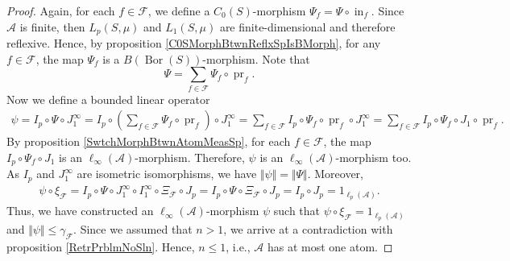 \documentclass[12pt]{article}
\begin{document}
\begin{proof}
    Again, for each $f\in\mathcal{F}$, we define 
    a $C_0(S)$-morphism $\Psi_f=\Psi\circ \operatorname{in}_f$. 
    Since $\mathcal{A}$ is finite, then $L_p(S,\mu)$ and $L_1(S,\mu)$ are
    finite-dimensional and therefore reflexive. Hence, by 
    proposition \ref{C0SMorphBtwnReflxSpIsBMorph}, for any $f\in\mathcal{F}$, the
    map $\Psi_f$ is a $B(\operatorname{Bor}(S))$-morphism. Note that
    \[
        \Psi=\sum_{f\in\mathcal{F}} \Psi_f\circ\operatorname{pr}_f.
    \]
    Now we define a bounded linear operator
    \[
    \begin{aligned}
        \psi
        =I_p\circ\Psi\circ J_1^\infty
        =I_p\circ\left(
            \sum_{f\in\mathcal{F}} \Psi_f\circ \operatorname{pr}_f
        \right)\circ J_1^\infty 
        =\sum_{f\in\mathcal{F}} 
            I_p\circ\Psi_f\circ\operatorname{pr}_f\circ J_1^\infty 
        =\sum_{f\in\mathcal{F}} 
            I_p\circ\Psi_f\circ J_1\circ\operatorname{pr}_f.
    \end{aligned} 
    \]
    By proposition \ref{SwtchMorphBtwnAtomMeasSp}, for each $f\in \mathcal{F}$, 
    the map $I_p\circ \Psi_f\circ J_1$ is 
    an $\ell_\infty(\mathcal{A})$-morphism. Therefore, $\psi$ is 
    an $\ell_\infty(\mathcal{A})$-morphism too. As $I_p$ and $J_1^{\infty}$ are
    isometric isomorphisms, we have $\Vert\psi\Vert=\Vert\Psi\Vert$. Moreover,
    \[
    \begin{aligned}
        \psi\circ\xi_\mathcal{F}
        = I_p\circ\Psi\circ J_1^{\infty}\circ 
            I_1^{\infty}\circ \Xi_{\mathcal{F}}\circ J_p
        = I_p\circ\Psi\circ \Xi_{\mathcal{F}}\circ J_p
        = I_p\circ J_p
        = 1_{\ell_p(\mathcal{A})}.
    \end{aligned}
    \]
    Thus, we have constructed an $\ell_\infty(\mathcal{A})$-morphism $\psi$
    such that $\psi\circ\xi_{\mathcal{F}}=1_{\ell_p(\mathcal{A})}$ 
    and $\Vert \psi\Vert\leq\gamma_{\mathcal{F}}$. Since we assumed that $n>1$,
    we arrive at a contradiction with proposition \ref{RetrPrblmNoSln}. 
    Hence, $n\leq 1$, i.e., $\mathcal{A}$ has at most one atom.
\end{proof}
\end{document}
